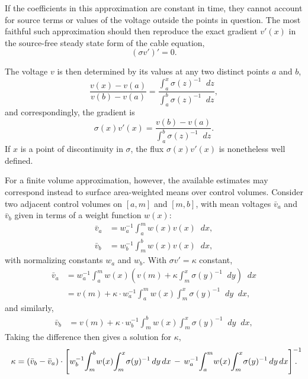 \documentclass[parskip=half]{scrartcl}
\newcommand{\Int}[2]{\int_{#1}^{#2}\!}
\newcommand{\D}{\mathop{}\!d}
\theoremstyle{nonumberplain}
\begin{document}
If the coefficients in this approximation are constant in
time, they cannot account for source terms or values of the
voltage outside the points in question. The most faithful
such approximation should then reproduce the exact gradient $v'(x)$
in the source-free steady state form of the cable equation,
\begin{equation}
    (\sigma v')' = 0.
\end{equation}

The voltage $v$ is then determined by its values at
any two distinct points $a$ and $b$,
\begin{equation}
    \frac{v(x) - v(a)}{v(b) - v(a)} =
    \frac{\displaystyle \Int{a}{x} \sigma(z)^{-1} \D z}
	 {\displaystyle \Int{a}{b} \sigma(z)^{-1} \D z},
\end{equation}
and correspondingly, the gradient is
\begin{equation}
    \sigma(x) v'(x) =
    \frac{v(b) - v(a)}
	 {\displaystyle\Int{a}{b} \sigma(z)^{-1} \D z}.
\end{equation}
If $x$ is a point of discontinuity in $\sigma$,
the flux $\sigma(x)v'(x)$ is nonetheless well defined.

For a finite volume approximation, however, the available
estimates may correspond instead to surface area-weighted means
over control volumes. Consider two adjacent control volumes
on $[a, m]$ and $[m, b]$, with mean voltages $\bar v_a$ and
$\bar v_b$ given in terms of a weight function $w(x)$:
\begin{align}
    \bar v_a &= w_a^{-1} \Int{a}{m} w(x)v(x) \D x,\\
    \bar v_b &= w_b^{-1} \Int{m}{b} w(x)v(x) \D x,
\end{align}
with normalizing constants $w_a$ and $w_b$. With $\sigma v' = \kappa$
constant,
\begin{equation}
    \begin{aligned}
	\bar v_a
	&= w_a^{-1} \Int{a}{m} w(x) \left( v(m) + \kappa \Int{m}{x} \sigma(y)^{-1} \D y \right) \D x \\
	&= v(m) + \kappa \cdot w_a^{-1} \Int{a}{m} w(x) \Int{m}{x} \sigma(y)^{-1} \D y \D x,
    \end{aligned}
\end{equation}
and similarly, 
\begin{equation}
    \begin{aligned}
	\bar v_b
	&= v(m) + \kappa \cdot w_b^{-1} \Int{m}{b} w(x) \Int{m}{x} \sigma(y)^{-1} \D y \D x,
    \end{aligned}
\end{equation}
Taking the difference then gives a solution for $\kappa$,
\begin{equation}
    \kappa = (\bar v_b - \bar v_a) \cdot \left[
	w_b^{-1}\!\Int{m}{b} w(x)\! \Int{m}{x} \sigma(y)^{-1} \D y \D x\,-\,
	w_a^{-1}\!\Int{a}{m} w(x)\! \Int{m}{x} \sigma(y)^{-1} \D y \D x
	\right]^{\mathrlap{-1}}.
\end{equation}
\end{document}
